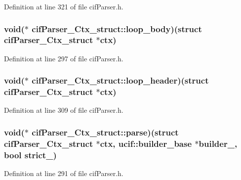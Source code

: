 Definition at line 321 of file cif\-Parser.\-h.

\hypertarget{structcif_parser___ctx__struct_ad44ce35861b1c696536efe669dc03ef4}{
\subsubsection[{loop\-\_\-body}]{\setlength{\rightskip}{0pt plus 5cm}void($\ast$ cif\-Parser\-\_\-\-Ctx\-\_\-struct\-::loop\-\_\-body)(struct {\bf cif\-Parser\-\_\-\-Ctx\-\_\-struct} $\ast$ctx)}}\label{structcif_parser___ctx__struct_ad44ce35861b1c696536efe669dc03ef4}


Definition at line 297 of file cif\-Parser.\-h.

\hypertarget{structcif_parser___ctx__struct_a3ed187c354e3aa3db97944af3cec4992}{
\subsubsection[{loop\-\_\-header}]{\setlength{\rightskip}{0pt plus 5cm}void($\ast$ cif\-Parser\-\_\-\-Ctx\-\_\-struct\-::loop\-\_\-header)(struct {\bf cif\-Parser\-\_\-\-Ctx\-\_\-struct} $\ast$ctx)}}\label{structcif_parser___ctx__struct_a3ed187c354e3aa3db97944af3cec4992}


Definition at line 309 of file cif\-Parser.\-h.

\hypertarget{structcif_parser___ctx__struct_ae1f6fcfdacaac08cf77d8e469c7be421}{
\subsubsection[{parse}]{\setlength{\rightskip}{0pt plus 5cm}void($\ast$ cif\-Parser\-\_\-\-Ctx\-\_\-struct\-::parse)(struct {\bf cif\-Parser\-\_\-\-Ctx\-\_\-struct} $\ast$ctx, {\bf ucif\-::builder\-\_\-base} $\ast$builder\-\_\-, bool strict\-\_\-)}}\label{structcif_parser___ctx__struct_ae1f6fcfdacaac08cf77d8e469c7be421}


Definition at line 291 of file cif\-Parser.\-h.

